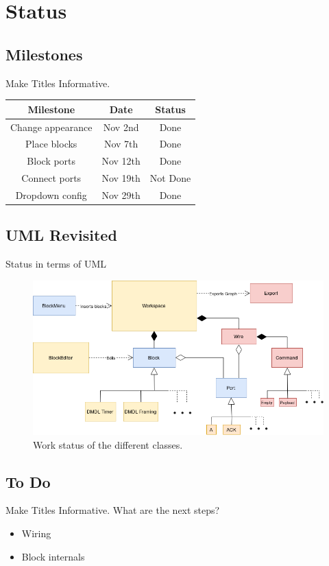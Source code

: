 \documentclass{beamer}
\begin{document}
\section{Status}

\subsection{Milestones}
\begin{frame}{Make Titles Informative.}
\centering
	\begin{tabular}{|c|c|c|} \hline
		\textbf{Milestone} & \textbf{Date} & \textbf{Status} \\ \hline
		Change appearance & Nov 2nd & Done \\ \hline
		Place blocks & Nov 7th & Done \\ \hline
		Block ports & Nov 12th & Done \\ \hline
		Connect ports & Nov 19th & Not Done \\ \hline
		Dropdown config & Nov 29th & Done \\ \hline
	\end{tabular}
\end{frame}


\subsection{UML Revisited}
\begin{frame}{Status in terms of UML}
\centering
	\begin{figure}
 		\includegraphics[width=\linewidth]{dmdl-editor-status.png}
 		\caption{Work status of the different classes.}
 		\label{fig:uml-status}
	\end{figure}
\end{frame}


\subsection{To Do}
\begin{frame}{Make Titles Informative.}
	What are the next steps?
	\begin{itemize}
		\item<2-> Wiring
		\item<3-> Block internals
	\end{itemize}
\end{frame}
\end{document}
